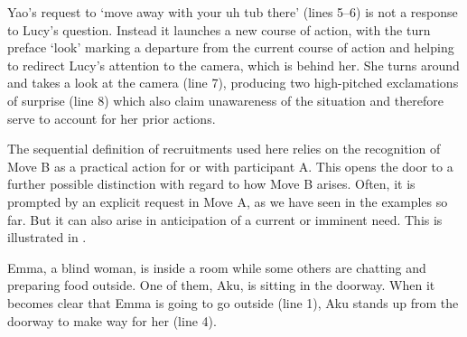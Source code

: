 \documentclass[output=paper]{langsci/langscibook}
\begin{document}
Yao’s request to ‘move away with your uh tub there’ (lines 5--6) is not a response to Lucy’s question. Instead it launches a new course of action, with the turn preface ‘look’ marking a departure from the current course of action \citep{sidnell_look-prefaced_2007} and helping to redirect Lucy’s attention to the camera, which is behind her. She turns around and takes a look at the camera (line 7), producing two high-pitched exclamations of surprise (line 8) which also claim unawareness of the situation and therefore serve to account for her prior actions.

The sequential definition of recruitments used here relies on the recognition of Move B as a practical action for or with participant A. This opens the door to a further possible distinction with regard to how Move B arises. Often, it is prompted by an explicit request in Move A, as we have seen in the examples so far. But it can also arise in anticipation of a current or imminent need. This is illustrated in . 

Emma, a blind woman, is inside a room while some others are chatting and preparing food outside. One of them, Aku, is sitting in the doorway. When it becomes clear that Emma is going to go outside (line 1), Aku stands up from the doorway to make way for her (line 4).
\end{document}
